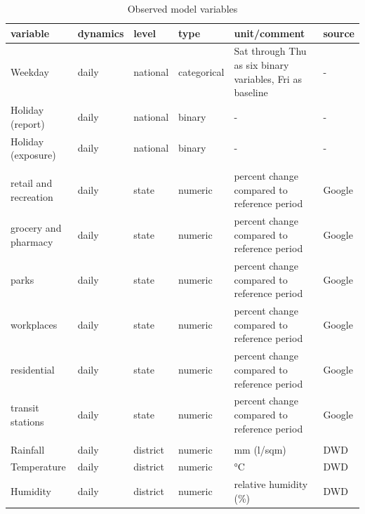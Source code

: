 \documentclass[]{elsarticle} %
\begin{document}
\begin{table}

\caption{\label{tab:model-vars}Observed model variables}
\centering
\fontsize{6}{8}\selectfont
\begin{tabular}[t]{llll>{\raggedright\arraybackslash}p{10em}l}
\toprule
variable & dynamics & level & type & unit/comment & source\\
\midrule
Weekday & daily & national & categorical & Sat through Thu as six binary variables, Fri as baseline & -\\
Holiday (report) & daily & national & binary & - & -\\
Holiday (exposure) & daily & national & binary & - & -\\
\addlinespace[0.3em]
\multicolumn{6}{l}{\textbf{Mobility}}\\
\hspace{1em}retail and recreation & daily & state & numeric & percent change compared to reference period & Google \citep{google_mobility}\\
\hspace{1em}grocery and pharmacy & daily & state & numeric & percent change compared to reference period & Google \citep{google_mobility}\\
\hspace{1em}parks & daily & state & numeric & percent change compared to reference period & Google \citep{google_mobility}\\
\hspace{1em}workplaces & daily & state & numeric & percent change compared to reference period & Google \citep{google_mobility}\\
\hspace{1em}residential & daily & state & numeric & percent change compared to reference period & Google \citep{google_mobility}\\
\hspace{1em}transit stations & daily & state & numeric & percent change compared to reference period & Google \citep{google_mobility}\\
\addlinespace[0.3em]
\multicolumn{6}{l}{\textbf{Weather}}\\
\hspace{1em}Rainfall & daily & district & numeric & mm (l/sqm) & DWD \citep{dwd_weather}\\
\hspace{1em}Temperature & daily & district & numeric & °C & DWD \citep{dwd_weather}\\
\hspace{1em}Humidity & daily & district & numeric & relative humidity (\%) & DWD \citep{dwd_weather}\\

\end{tabular}
\end{table}
\end{document}
